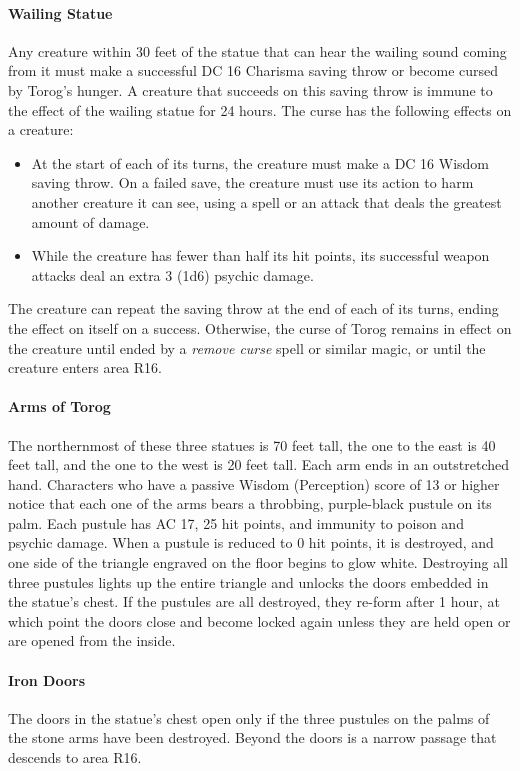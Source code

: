 \documentclass[10pt,a4,twoside,twocolumn,openany,nodeprecatedcode]{dndbook}
\begin{document}
\paragraph{Wailing Statue}
Any creature within 30 feet of the statue that can hear the wailing sound coming from it must make a successful DC 16 Charisma saving throw or become cursed by Torog's hunger. A creature that succeeds on this saving throw is immune to the effect of the wailing statue for 24 hours. The curse has the following effects on a creature:
\begin{itemize}

\item At the start of each of its turns, the creature must make a DC 16 Wisdom saving throw. On a failed save, the creature must use its action to harm another creature it can see, using a spell or an attack that deals the greatest amount of damage.
\item While the creature has fewer than half its hit points, its successful weapon attacks deal an extra 3 (1d6) psychic damage.
\end{itemize}


The creature can repeat the saving throw at the end of each of its turns, ending the effect on itself on a success. Otherwise, the curse of Torog remains in effect on the creature until ended by a \textit{remove curse} spell or similar magic, or until the creature enters area R16.
\paragraph{Arms of Torog}
The northernmost of these three statues is 70 feet tall, the one to the east is 40 feet tall, and the one to the west is 20 feet tall. Each arm ends in an outstretched hand.
Characters who have a passive Wisdom (Perception) score of 13 or higher notice that each one of the arms bears a throbbing, purple-black pustule on its palm. Each pustule has AC 17, 25 hit points, and immunity to poison and psychic damage. When a pustule is reduced to 0 hit points, it is destroyed, and one side of the triangle engraved on the floor begins to glow white. Destroying all three pustules lights up the entire triangle and unlocks the doors embedded in the statue's chest. If the pustules are all destroyed, they re-form after 1 hour, at which point the doors close and become locked again unless they are held open or are opened from the inside.
\paragraph{Iron Doors}
The doors in the statue's chest open only if the three pustules on the palms of the stone arms have been destroyed. Beyond the doors is a narrow passage that descends to area R16.
\end{document}
